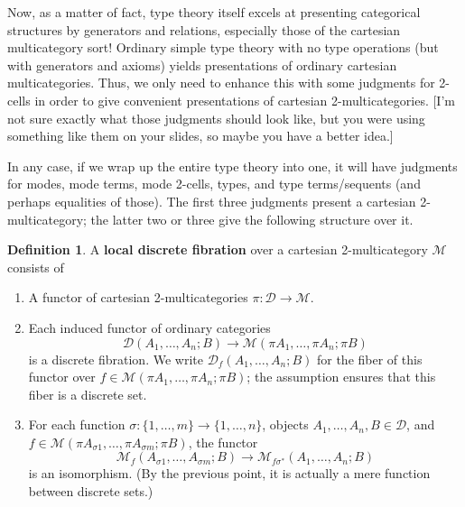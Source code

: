 \documentclass{amsart}
\theoremstyle{definition}
\newtheorem{defn}[thm]{Definition}
\def\M{\mathcal{M}}
\def\D{\mathcal{D}}
\begin{document}
Now, as a matter of fact, type theory itself excels at presenting categorical structures by generators and relations, especially those of the cartesian multicategory sort!
Ordinary simple type theory with no type operations (but with generators and axioms) yields presentations of ordinary cartesian multicategories.
Thus, we only need to enhance this with some judgments for 2-cells in order to give convenient presentations of cartesian 2-multicategories.
[I'm not sure exactly what those judgments should look like, but you were using something like them on your slides, so maybe you have a better idea.]

In any case, if we wrap up the entire type theory into one, it will have judgments for modes, mode terms, mode 2-cells, types, and type terms/sequents (and perhaps equalities of those).
The first three judgments present a cartesian 2-multicategory; the latter two or three give the following structure over it.

\begin{defn}
  A \textbf{local discrete fibration} over a cartesian 2-multicategory $\M$ consists of
  \begin{enumerate}
  \item A functor of cartesian 2-multicategories $\pi:\D\to\M$.
  \item Each induced functor of ordinary categories
    \[\D(A_1,\dots,A_n;B)\to\M(\pi A_1,\dots,\pi A_n;\pi B)\]
    is a discrete fibration.
    We write $\D_f(A_1,\dots,A_n;B)$ for the fiber of this functor over $f\in \M(\pi A_1,\dots,\pi A_n;\pi B)$; the assumption ensures that this fiber is a discrete set.
  \item For each function $\sigma : \{1,\dots,m\} \to \{1,\dots,n\}$, objects $A_1,\dots,A_n,B \in \D$, and $f\in\M(\pi A_{\sigma 1},\dots,\pi A_{\sigma m}; \pi B)$, the functor
    \[\M_f(A_{\sigma 1},\dots,A_{\sigma m}; B) \to \M_{f\sigma^*}(A_1,\dots,A_n;B)\]
    is an isomorphism.
    (By the previous point, it is actually a mere function between discrete sets.)
  \end{enumerate}
\end{defn}
\end{document}
